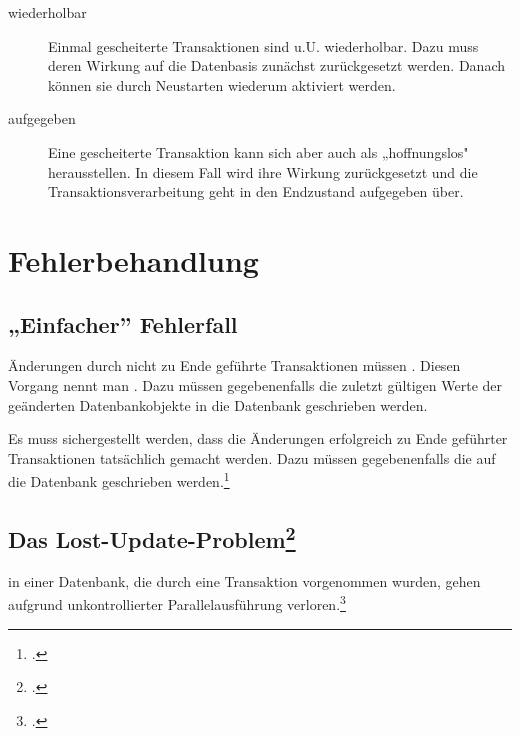 \documentclass{bschlangaul-theorie}
\begin{document}
\begin{description}
\item[wiederholbar]

Einmal gescheiterte Transaktionen sind u.U. wiederholbar. Dazu muss
deren Wirkung auf die Datenbasis zunächst zurückgesetzt werden. Danach
können sie durch Neustarten wiederum aktiviert werden.

\item[aufgegeben]

Eine gescheiterte Transaktion kann sich aber auch als „hoffnungslos"
herausstellen. In diesem Fall wird ihre Wirkung zurückgesetzt und die
Transaktionsverarbeitung geht in den Endzustand aufgegeben über.
\end{description}

%

\section{Fehlerbehandlung}

%

\subsection{„Einfacher” Fehlerfall}

Änderungen durch nicht zu Ende geführte Transaktionen müssen
. Diesen Vorgang nennt man
. Dazu müssen gegebenenfalls die zuletzt gültigen Werte
der geänderten Datenbankobjekte in die Datenbank geschrieben werden.

Es muss sichergestellt werden, dass die Änderungen erfolgreich zu Ende
geführter Transaktionen tatsächlich  gemacht werden.
Dazu müssen gegebenenfalls die  auf die Datenbank geschrieben werden.\footcite[Seite
11]{db:fs:5}

%

\subsection{Das Lost-Update-Problem\footcite{wiki:verlorenes-update}}

 in einer Datenbank, die durch eine Transaktion
vorgenommen wurden, gehen aufgrund unkontrollierter Parallelausführung
verloren.\footcite[11.1.1 Verlorengegangenee Änderungen, Seite 332]{kemper}
\end{document}
